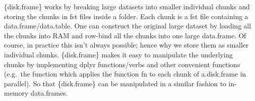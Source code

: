	\{disk.frame\} works by breaking large datasets into smaller individual
	chunks and storing the chunks in fst files inside a folder. Each chunk
	is a fst file containing a data.frame/data.table. One can construct the
	original large dataset by loading all the chunks into RAM and row-bind
	all the chunks into one large data.frame. Of course, in practice this
	isn't always possible; hence why we store them as smaller individual
	chunks. \{disk.frame\} makes it easy to manipulate the underlying chunks
	by implementing dplyr functions/verbs and other convenient functions
	(e.g.~the  function which applies the function fn to each chunk of a.disk.frame in
	parallel). So that \{disk.frame\} can be manipulated in a similar
	fashion to in-memory data.frames.
